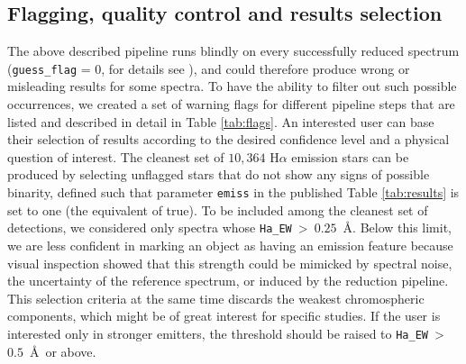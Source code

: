 
\subsection{Flagging, quality control and results selection}
\label{sec:flagging}
The above described pipeline runs blindly on every successfully reduced spectrum (\texttt{guess\_flag} = 0, for details see \citet{2017MNRAS.464.1259K}), and could therefore produce wrong or misleading results for some spectra. To have the ability to filter out such possible occurrences, we created a set of warning flags for different pipeline steps that are listed and described in detail in Table \ref{tab:flags}. An interested user can base their selection of results according to the desired confidence level and a physical question of interest. The cleanest set of $10,364$ H$\alpha$ emission stars can be produced by selecting unflagged stars that do not show any signs of possible binarity, defined such that parameter \texttt{emiss} in the published Table \ref{tab:results} is set to one (the equivalent of true). To be included among the cleanest set of detections, we considered only spectra whose \texttt{Ha\_EW}~>~$0.25$~\AA. Below this limit, we are less confident in marking an object as having an emission feature because visual inspection showed that this strength could be mimicked by spectral noise, the uncertainty of the reference spectrum, or induced by the reduction pipeline. This selection criteria at the same time discards the weakest chromospheric components, which might be of great interest for specific studies. If the user is interested only in stronger emitters, the threshold should be raised to \texttt{Ha\_EW}~>~$0.5$~\AA\ or above.

